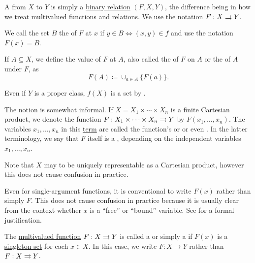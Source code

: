 \begin{definition}\label{def:function}
  A  from \( X \) to \( Y \) is simply a \hyperref[def:binary_relation]{binary relation} \( (F, X, Y) \), the difference being in how we treat multivalued functions and relations. We use the notation \( F: X \rightrightarrows Y \).

  \begin{DefEnum}[series=def:function]
     We call the set \( B \) the  of \( F \) at \( x \) if \( y \in B \iff (x, y) \in f \) and use the notation \( F(x) = B \).

     If \( A \subseteq X \), we define the value of \( F \) at \( A \), also called the  of \( F \) on \( A \) or the  of \( A \) under \( F \), as
    \begin{equation*}
      F(A) \coloneqq \cup_{a \in A} \{ F(a) \}.
    \end{equation*}

    Even if \( Y \) is a proper class, \( f(X) \) is a set by .

     The notion  is somewhat informal. If \( X = X_1 \times \cdots \times X_n \) is a finite Cartesian product, we denote the function \( F: X_1 \times \cdots \times X_n \rightrightarrows Y \) by \( F(x_1, \ldots, x_n) \). The variables \( x_1, \ldots, x_n \) in this \hyperref[def:first_order_term]{term} are called the function's  or  or even . In the latter terminology, we say that \( F \) itself is a , depending on the independent variables \( x_1, \ldots, x_n \).

    Note that \( X \) may to be uniquely representable as a Cartesian product, however this does not cause confusion in practice.

    Even for single-argument functions, it is conventional to write \( F(x) \) rather than simply \( F \). This does not cause confusion in practice because it is usually clear from the context whether \( x \) is a \enquote{free} or \enquote{bound} variable. See  for a formal justification.

     The \hyperref[def:function/multivalued]{multivalued function} \( F: X \rightrightarrows Y \) is called a  or simply a  if \( F(x) \) is a \hyperref[remark:singleton_sets]{singleton set} for each \( x \in X \). In this case, we write \( F: X \to Y \) rather than \( F: X \rightrightarrows Y \).


\end{DefEnum}
\end{definition}
